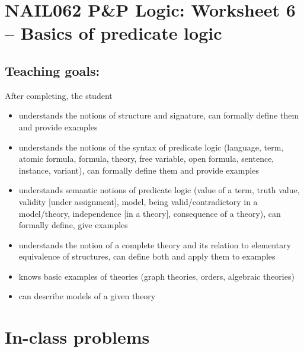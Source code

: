 \section*{NAIL062 P\&P Logic: Worksheet 6 -- Basics of predicate logic}


\subsection*{Teaching goals:} After completing, the student

\begin{itemize}\setlength{\itemsep}{0pt}
    \item understands the notions of structure and signature, can formally define them and provide examples
    \item understands the notions of the syntax of predicate logic (language, term, atomic formula, formula, theory, free variable, open formula, sentence, instance, variant), can formally define them and provide examples
    \item understands semantic notions of predicate logic (value of a term, truth value, validity [under assignment], model, being valid/contradictory in a model/theory, independence [in a theory], consequence of a theory), can formally define, give examples
    \item understands the notion of a complete theory and its relation to elementary equivalence of structures, can define both and apply them to examples
    \item knows basic examples of theories (graph theories, orders, algebraic theories)
    \item can describe models of a given theory    
\end{itemize}
    

\section*{In-class problems}


